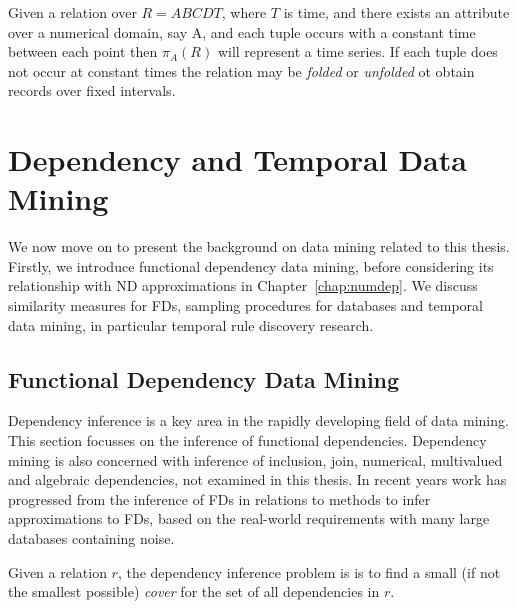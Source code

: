 \medskip

Given a relation over $R = ABCDT$, where $T$ is time, and there exists an
attribute over a numerical domain, say A, and each tuple occurs with a
constant time between each point then $\pi_A(R)$ will represent a time
series. If each tuple does not occur at constant times the relation
may be {\em folded} or {\em unfolded} ot obtain records over fixed intervals.

\section{Dependency and Temporal Data Mining}\label{sec:datmin}


We now move on to present the background on data mining related to
this thesis. Firstly, we introduce functional dependency data mining,
before considering its relationship with ND approximations in Chapter~\ref{chap:numdep}. We discuss similarity
measures for FDs, sampling procedures for databases and temporal data
mining, in particular temporal rule discovery research.


\subsection{Functional Dependency Data Mining}\label{subsec:fdmining}	


Dependency inference is a key area in the rapidly developing field of data mining. This section focusses on the inference of functional dependencies.  
Dependency mining is also concerned with inference of inclusion, join,
numerical, multivalued and algebraic dependencies, not examined in
this thesis. In recent years work has progressed from the inference of
FDs in relations to methods to infer approximations to FDs, based on
the real-world requirements with many large databases containing noise.


\begin{definition}
\begin{rm}
Given a relation $r$,  the  dependency inference problem is is to 
find a small (if not the smallest possible) {\em cover} for the set of 
all dependencies in $r$.
\end{rm}
\end{definition}


